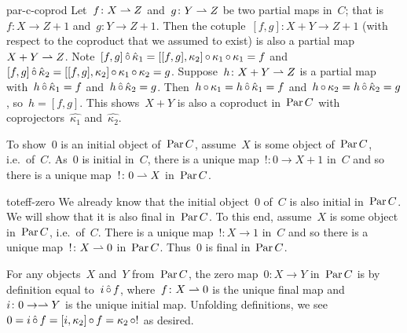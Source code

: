 \begin{solution}{par-c-coprod}%
    Let~$f\colon X \rightharpoonup Z$ and~$g\colon Y \rightharpoonup Z$
        be two partial maps in~$C$;
        that is~$f\colon X \to Z+1$ and~$g \colon Y \to Z+1$.
    Then the cotuple~$[f,g]\colon X+Y \to Z+1$
        (with respect to the coproduct that we assumed to exist)
    is also a partial map~$X+Y \rightharpoonup Z$.
Note~$[f,g] \mathop{\hat\circ} \hat\kappa_1
    = [[f,g],\kappa_2]\mathop{\circ}\kappa_1\mathop{\circ}\kappa_1 = f$
and~$[f,g] \mathop{\hat\circ} \hat\kappa_2
    = [[f,g],\kappa_2]\mathop{\circ}\kappa_1\mathop{\circ}\kappa_2 = g$.
Suppose~$h \colon X+Y \rightharpoonup Z$ is a partial map
    with~$h \mathop{\hat\circ} \hat\kappa_1 = f$
        and~$h \mathop{\hat\circ} \hat\kappa_2 = g$.
Then~$h \mathop{\circ} \kappa_1 = h \mathop{\hat\circ} \hat\kappa_1 = f$
and~$h \mathop{\circ} \kappa_2 = h \mathop{\hat\circ} \hat\kappa_2 = g$,
    so~$h = [f,g]$.
    This shows~$X+Y$ is also a coproduct in~$\operatorname{Par} C$ with
        coprojectors~$\hat{\kappa_1}$ and~$\hat{\kappa_2}$.

To show~$0$ is an initial object of~$\operatorname{Par} C$,
    assume~$X$ is some object of~$\operatorname{Par} C$, i.e.~of~$C$.
    As~$0$ is initial in~$C$, there
    is a unique map~$!\colon 0 \to X+1$ in~$C$
    and so there is a unique map~$!\colon 0 \rightharpoonup X$ in~$\operatorname{Par} C$.
\end{solution}
\begin{solution}{toteff-zero}%
We already know that the initial object~$0$ of~$C$
    is also initial in~$\operatorname{Par} C$.
    We will show that it is also final in~$\operatorname{Par} C$.
To this end, assume~$X$ is some object in~$\operatorname{Par} C$, i.e.~of~$C$.
There is a unique map~$!\colon X\to 1$ in~$C$
    and so there is a unique map~$!\colon X \rightharpoonup 0$ in~$\operatorname{Par} C$.
    Thus~$0$ is final in~$\operatorname{Par} C$.

For any objects~$X$ and~$Y$ from~$\operatorname{Par} C$,
    the zero map~$0\colon X \to Y$ in~$\operatorname{Par} C$
    is by definition equal to~$i \mathop{\hat\circ} f$,
    where~$f \colon X \rightharpoonup 0$ is the unique final map
        and~$i \colon 0 \to \rightharpoonup Y$ is the unique initial map.
Unfolding definitions, we see~$0 = i \mathop{\hat\circ} f = [i, \kappa_2]\mathop{\circ} f
        = \kappa_2\mathop{\circ} !$ as desired.
\end{solution}
